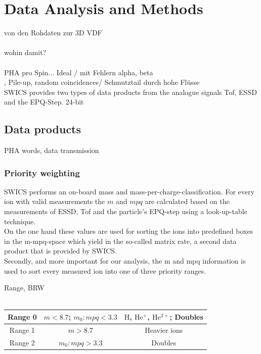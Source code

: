 
\chapter{Data Analysis and Methods} %

\label{Chapter:Data} 




von den Rohdaten zur 3D VDF
\\ \\
wohin damit? \\ \\
PHA pro Spin...
Ideal / mit Fehlern alpha, beta
\\ , Pile-up, random coincidences/ Schmutztail durch hohe Flüsse
\\
SWICS provides two types of data products from the analogue signals Tof, ESSD and the EPQ-Step.
24-bit



\section{Data products}
PHA words, data transmission

\subsection{Priority weighting}
SWICS performs an on-board mass and mass-per-charge-classification. For every ion with valid measurements the $m$ and $mpq$ are calculated based on the measurements of ESSD, Tof and the particle's EPQ-step using a look-up-table technique.\\
On the one hand these values are used for sorting the ions into predefined boxes in the m-mpq-space which yield in the so-called matrix rate, a second data product that is provided by SWICS.\\
Secondly, and more important for our analysis, the m and mpq information is used to sort every measured ion into one of three priority ranges.

Range, BRW\\ \\
\begin{tabular}{c|c|c}
	Range 0 & $m < 8.7$;  $m_0 : mpq < 3.3$ & $\mathrm{H}$, $\mathrm{He^+}$, $\mathrm{He^{2+}}$; Doubles\\ 
	\hline 
	Range 1 & $m > 8.7$ & Heavier ions \\ 
	\hline 
	Range 2 & $m_0 : mpq > 3.3$ & Doubles \\ 
\end{tabular} 

